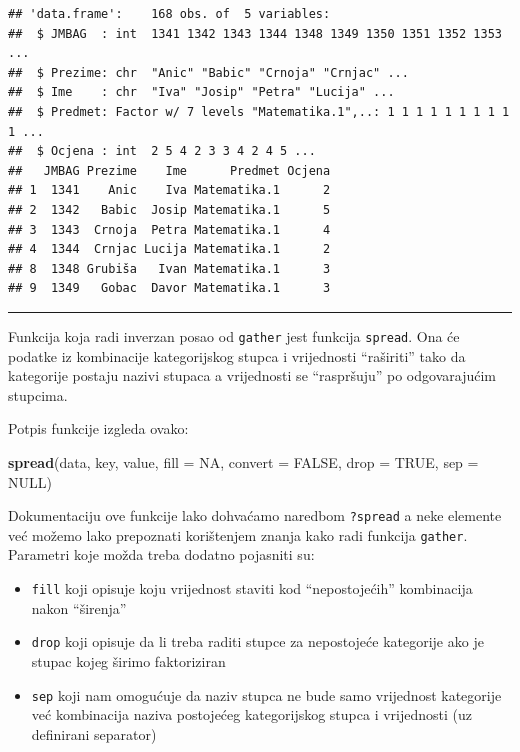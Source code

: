 \documentclass[]{book}
\newenvironment{Shaded}{\begin{snugshade}}{\end{snugshade}}
\newcommand{\KeywordTok}[1]{\textcolor[rgb]{0.13,0.29,0.53}{\textbf{#1}}}
\newcommand{\DataTypeTok}[1]{\textcolor[rgb]{0.13,0.29,0.53}{#1}}
\newcommand{\OtherTok}[1]{\textcolor[rgb]{0.56,0.35,0.01}{#1}}
\newcommand{\NormalTok}[1]{#1}
\providecommand{\tightlist}{%
  \setlength{\itemsep}{0pt}\setlength{\parskip}{0pt}}
\theoremstyle{definition}
\theoremstyle{definition}
\theoremstyle{definition}
\theoremstyle{remark}
\begin{document}
\begin{verbatim}
## 'data.frame':    168 obs. of  5 variables:
##  $ JMBAG  : int  1341 1342 1343 1344 1348 1349 1350 1351 1352 1353 ...
##  $ Prezime: chr  "Anic" "Babic" "Crnoja" "Crnjac" ...
##  $ Ime    : chr  "Iva" "Josip" "Petra" "Lucija" ...
##  $ Predmet: Factor w/ 7 levels "Matematika.1",..: 1 1 1 1 1 1 1 1 1 1 ...
##  $ Ocjena : int  2 5 4 2 3 3 4 2 4 5 ...
##   JMBAG Prezime    Ime      Predmet Ocjena
## 1  1341    Anic    Iva Matematika.1      2
## 2  1342   Babic  Josip Matematika.1      5
## 3  1343  Crnoja  Petra Matematika.1      4
## 4  1344  Crnjac Lucija Matematika.1      2
## 8  1348 Grubiša   Ivan Matematika.1      3
## 9  1349   Gobac  Davor Matematika.1      3
\end{verbatim}

\begin{center}\rule{0.5\linewidth}{\linethickness}\end{center}

Funkcija koja radi inverzan posao od \texttt{gather} jest funkcija
\texttt{spread}. Ona će podatke iz kombinacije kategorijskog stupca i
vrijednosti ``raširiti'' tako da kategorije postaju nazivi stupaca a
vrijednosti se ``raspršuju'' po odgovarajućim stupcima.

Potpis funkcije izgleda ovako:

\begin{Shaded}
\begin{Highlighting}[]
\KeywordTok{spread}\NormalTok{(data, key, value, }\DataTypeTok{fill =} \OtherTok{NA}\NormalTok{, }\DataTypeTok{convert =} \OtherTok{FALSE}\NormalTok{, }\DataTypeTok{drop =} \OtherTok{TRUE}\NormalTok{, }\DataTypeTok{sep =} \OtherTok{NULL}\NormalTok{)}
\end{Highlighting}
\end{Shaded}

Dokumentaciju ove funkcije lako dohvaćamo naredbom \texttt{?spread} a
neke elemente već možemo lako prepoznati korištenjem znanja kako radi
funkcija \texttt{gather}. Parametri koje možda treba dodatno pojasniti
su:

\begin{itemize}
\tightlist
\item
  \texttt{fill} koji opisuje koju vrijednost staviti kod
  ``nepostojećih'' kombinacija nakon ``širenja''
\item
  \texttt{drop} koji opisuje da li treba raditi stupce za nepostojeće
  kategorije ako je stupac kojeg širimo faktoriziran
\item
  \texttt{sep} koji nam omogućuje da naziv stupca ne bude samo
  vrijednost kategorije već kombinacija naziva postojećeg kategorijskog
  stupca i vrijednosti (uz definirani separator)
\end{itemize}
\end{document}
